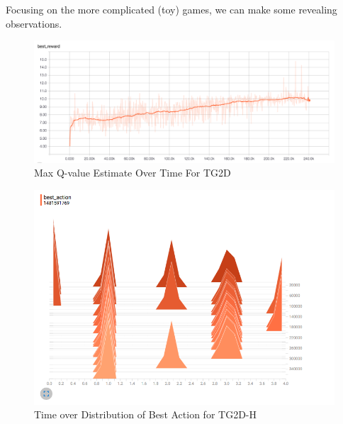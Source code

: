 \documentclass[12pt]{article}
\begin{document}
Focusing on the more complicated (toy) games, we can make some revealing observations.

\begin{figure}[H]
  \includegraphics[height=1\textwidth]{report/TG2D_best_reward}
  \centering
  \caption{Max Q-value Estimate Over Time For TG2D}
  \label{fig:maxqv}
\end{figure}

\begin{figure}[H]
  \includegraphics[height=1\textwidth]{report/TG2D-H_best_action_hist}
  \centering
  \caption{Time over Distribution of Best Action for TG2D-H}
  \label{fig:bahist}
\end{figure}
\end{document}
